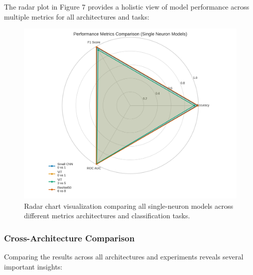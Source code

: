 \documentclass[11pt]{article}
\begin{document}
The radar plot in Figure 7 provides a holistic view of model performance across multiple metrics for all architectures and tasks:

\begin{figure}[htbp]
\centering
\includegraphics[width=\textwidth]{figures/radar_chart_comparison.png}
\caption{Radar chart visualization comparing all single-neuron models across different metrics architectures and classification tasks.}
\end{figure}

\subsubsection{Cross-Architecture Comparison}
Comparing the results across all architectures and experiments reveals several important insights:
\end{document}
